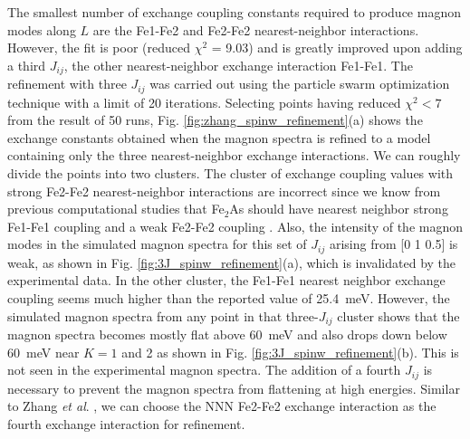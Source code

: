 \documentclass[letterpaper,10pt,doublespacing,edeposit]{uiucthesis2020}
\begin{document}
\begin{mainmatter}
The smallest number of exchange coupling constants required to produce magnon modes along $L$ are the Fe1-Fe2 and Fe2-Fe2 nearest-neighbor interactions. However, the fit is poor (reduced $\chi^2$ = 9.03) and is greatly improved upon adding a third $J_{ij}$, the other nearest-neighbor exchange interaction Fe1-Fe1. 
The refinement with three $J_{ij}$ was carried out using the particle swarm optimization technique with a limit of 20 iterations.
Selecting points having reduced $\chi^2 < 7$  from the result of 50 runs, Fig. \ref{fig:zhang_spinw_refinement}(a) shows the exchange constants obtained when the magnon spectra is refined to a model containing only the three nearest-neighbor exchange interactions. 
We can roughly divide the points into two clusters. The cluster of exchange coupling values with strong Fe2-Fe2 nearest-neighbor interactions are incorrect since we know from previous computational studies that Fe$_2$As should have nearest neighbor strong Fe1-Fe1 coupling and a weak Fe2-Fe2 coupling \cite{Zhang2013}. Also, the intensity of the magnon modes in the simulated magnon spectra for this set of $J_{ij}$ arising from [0 1 0.5] is weak, as shown in Fig. \ref{fig:3J_spinw_refinement}(a), which is invalidated by the experimental data. In the other cluster, the Fe1-Fe1 nearest neighbor exchange coupling seems much higher than the reported value of 25.4~meV. However, the simulated magnon spectra from any point in that three-$J_{ij}$ cluster shows that the magnon spectra becomes mostly flat above 60~meV and also drops down below 60~meV near $K = 1$ and 2 as shown in Fig. \ref{fig:3J_spinw_refinement}(b). This is not seen in the experimental magnon spectra. The addition of a fourth $J_{ij}$ is necessary to prevent the magnon spectra from flattening at high energies. Similar to Zhang \emph{et al}. \cite{Zhang2013}, we can choose the NNN Fe2-Fe2 exchange interaction as the fourth exchange interaction for refinement.



\end{mainmatter}
\end{document}
